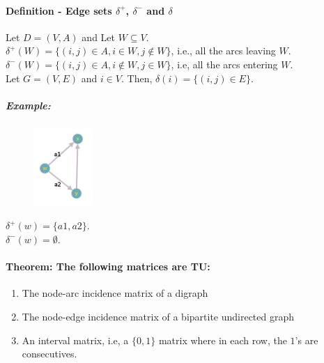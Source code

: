 \documentclass[main]{subfiles}
\begin{document}
\paragraph{Definition -  Edge sets $\delta^+$, $\delta^-$ and $\delta$}
Let $D=(V,A)$ and Let $W \subseteq V$.\\
$\delta^+(W) = \{(i,j) \in A, i \in W, j \notin W \}$, i.e., all the arcs
leaving $W$.\\
$\delta^-(W) = \{(i,j) \in A, i \notin W, j \in W \}$, i.e, all the arcs
entering $W$.\\
Let $G=(V,E)$ and $i \in V$. Then, $\delta(i) = \{(i,j) \in E\}$.

\subparagraph{Example:}
\begin{figure}[!h]
  \centering
    \includegraphics[width=0.2\textwidth]{imgs/graph-definition.png}
\end{figure}

$\delta^+(w) = \{a1,a2\}$.\\
$\delta^-(w) = \emptyset$.\\

\paragraph{Theorem: The following matrices are TU:}
\begin{enumerate}
\item The node-arc incidence matrix of a digraph
\item The node-edge incidence matrix of a bipartite undirected graph
\item An interval matrix, i.e, a $\{0,1\}$ matrix where in each row, the $1$'s
are consecutives.
\end{enumerate}
\end{document}

